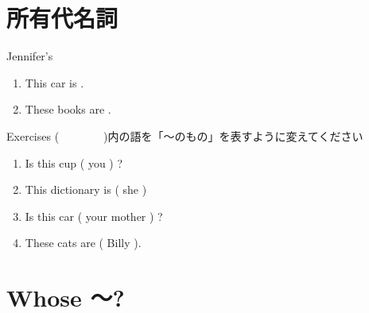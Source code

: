 \documentclass[aspectratio=169,xcolor={dvipsnames,table}]{beamer}
\begin{document}
\section{所有代名詞}
\begin{frame}[plain]{Jennifer's}
 
\begin{enumerate}
 \item This car is .
 \item These books are .
\end{enumerate}


\end{frame}
\begin{frame}[plain]{Exercises}
(~~~~~~~~)内の語を「〜のもの」を表すように変えてください
 \begin{enumerate}
  \item Is this cup ( you ) ?\hfill{}\hspace{180pt}\mbox{}
  \item This dictionary is ( she )\hfill{}\hspace{180pt}\mbox{}
  \item Is this car ( your mother ) ?\hfill{}\hspace{180pt}\mbox{}
  \item These cats are ( Billy ).\hfill{}\hspace{180pt}\mbox{}
 \end{enumerate}
\end{frame}


\section{Whose 〜?}
\end{document}
